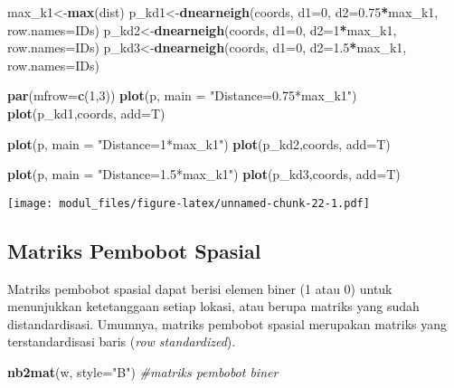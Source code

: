 \documentclass[
]{book}
\newenvironment{Shaded}{\begin{snugshade}}{\end{snugshade}}
\newcommand{\CommentTok}[1]{\textcolor[rgb]{0.56,0.35,0.01}{\textit{#1}}}
\newcommand{\DataTypeTok}[1]{\textcolor[rgb]{0.13,0.29,0.53}{#1}}
\newcommand{\DecValTok}[1]{\textcolor[rgb]{0.00,0.00,0.81}{#1}}
\newcommand{\FloatTok}[1]{\textcolor[rgb]{0.00,0.00,0.81}{#1}}
\newcommand{\KeywordTok}[1]{\textcolor[rgb]{0.13,0.29,0.53}{\textbf{#1}}}
\newcommand{\NormalTok}[1]{#1}
\newcommand{\OperatorTok}[1]{\textcolor[rgb]{0.81,0.36,0.00}{\textbf{#1}}}
\newcommand{\StringTok}[1]{\textcolor[rgb]{0.31,0.60,0.02}{#1}}
\begin{document}
\begin{Shaded}
\begin{Highlighting}[]
\NormalTok{max\_k1\textless{}{-}}\KeywordTok{max}\NormalTok{(dist)}
\NormalTok{p\_kd1\textless{}{-}}\KeywordTok{dnearneigh}\NormalTok{(coords, }\DataTypeTok{d1=}\DecValTok{0}\NormalTok{, }\DataTypeTok{d2=}\FloatTok{0.75}\OperatorTok{*}\NormalTok{max\_k1, }\DataTypeTok{row.names=}\NormalTok{IDs)}
\NormalTok{p\_kd2\textless{}{-}}\KeywordTok{dnearneigh}\NormalTok{(coords, }\DataTypeTok{d1=}\DecValTok{0}\NormalTok{, }\DataTypeTok{d2=}\DecValTok{1}\OperatorTok{*}\NormalTok{max\_k1, }\DataTypeTok{row.names=}\NormalTok{IDs)}
\NormalTok{p\_kd3\textless{}{-}}\KeywordTok{dnearneigh}\NormalTok{(coords, }\DataTypeTok{d1=}\DecValTok{0}\NormalTok{, }\DataTypeTok{d2=}\FloatTok{1.5}\OperatorTok{*}\NormalTok{max\_k1, }\DataTypeTok{row.names=}\NormalTok{IDs)}

\KeywordTok{par}\NormalTok{(}\DataTypeTok{mfrow=}\KeywordTok{c}\NormalTok{(}\DecValTok{1}\NormalTok{,}\DecValTok{3}\NormalTok{))}
\KeywordTok{plot}\NormalTok{(p, }\DataTypeTok{main =} \StringTok{"Distance=0.75*max\_k1"}\NormalTok{)}
\KeywordTok{plot}\NormalTok{(p\_kd1,coords, }\DataTypeTok{add=}\NormalTok{T)}

\KeywordTok{plot}\NormalTok{(p, }\DataTypeTok{main =} \StringTok{"Distance=1*max\_k1"}\NormalTok{)}
\KeywordTok{plot}\NormalTok{(p\_kd2,coords, }\DataTypeTok{add=}\NormalTok{T)}

\KeywordTok{plot}\NormalTok{(p, }\DataTypeTok{main =} \StringTok{"Distance=1.5*max\_k1"}\NormalTok{)}
\KeywordTok{plot}\NormalTok{(p\_kd3,coords, }\DataTypeTok{add=}\NormalTok{T)}
\end{Highlighting}
\end{Shaded}

\texttt{[image: modul\_files/figure-latex/unnamed-chunk-22-1.pdf]}

\hypertarget{matriks-pembobot-spasial}{%
\subsection{Matriks Pembobot Spasial}\label{matriks-pembobot-spasial}}

Matriks pembobot spasial dapat berisi elemen biner (1 atau 0) untuk menunjukkan ketetanggaan setiap lokasi, atau berupa matriks yang sudah distandardisasi. Umumnya, matriks pembobot spasial merupakan matriks yang terstandardisasi baris (\emph{row standardized}).

\begin{Shaded}
\begin{Highlighting}[]
\KeywordTok{nb2mat}\NormalTok{(w, }\DataTypeTok{style=}\StringTok{"B"}\NormalTok{)  }\CommentTok{\#matriks pembobot biner}
\end{Highlighting}
\end{Shaded}
\end{document}

